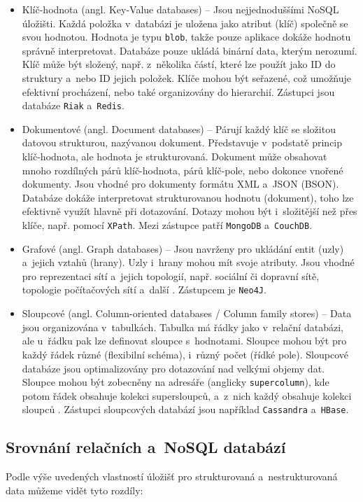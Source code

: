 \begin{itemize}
    \item Klíč-hodnota (angl. Key-Value databases) -- Jsou nejjednoduššími NoSQL úložišti. Každá položka v~databázi je uložena jako atribut (klíč) společně se svou hodnotou. Hodnota je typu \texttt{blob}, takže pouze aplikace dokáže hodnotu správně interpretovat. Databáze pouze ukládá binární data, kterým nerozumí. Klíč může být složený, např. z~několika částí, které lze použít jako ID do struktury a~nebo ID jejich položek. Klíče mohou být seřazené, což umožňuje efektivní procházení, nebo také organizovány do hierarchií. Zástupci jsou databáze \texttt{Riak} a~\texttt{Redis}.
    
    \item Dokumentové (angl. Document databases) -- Párují každý klíč se složitou datovou strukturou, nazývanou dokument. Představuje v~podstatě princip klíč-hodnota, ale hodnota je strukturovaná. Dokument může obsahovat mnoho rozdílných párů klíč-hodnota, párů klíč-pole, nebo dokonce vnořené dokumenty. Jsou vhodné pro dokumenty formátu XML a~JSON (BSON).
    Databáze dokáže interpretovat strukturovanou hodnotu (dokument), toho lze efektivně využít hlavně při dotazování. Dotazy mohou být i~složitější než přes klíče, např. pomocí \texttt{XPath}. Mezi zástupce patří \texttt{MongoDB} a~\texttt{CouchDB}.
    
    \item Grafové (angl. Graph databases) -- Jsou navrženy pro ukládání entit (uzly) a~jejich vztahů (hrany). Uzly i~hrany mohou mít svoje atributy. Jsou vhodné pro reprezentaci sítí a~jejich topologií, např. sociální či dopravní sítě, topologie počítačových sítí a~další \cite{noSqlPdb}.
    Zástupcem je \texttt{Neo4J}.
    
    \item Sloupcové (angl. Column-oriented databases / Column family stores) -- Data jsou organizována v~tabulkách. Tabulka má řádky jako v~relační databázi, ale u~řádku pak lze definovat sloupce s~hodnotami. Sloupce mohou být pro každý řádek různé (flexibilní schéma), i~různý počet (řídké pole). Sloupcové databáze jsou optimalizovány pro dotazování nad velkými objemy dat. Sloupce mohou být zobecněny na adresáře (anglicky \texttt{supercolumn}), kde potom řádek obsahuje kolekci supersloupců, a~z~nich každý obsahuje kolekci sloupců \cite{noSqlPdb}. Zástupci sloupcových databází jsou například \texttt{Cassandra} a~\texttt{HBase}.
\end{itemize}

\subsection{Srovnání relačních a~NoSQL databází}
Podle výše uvedených vlastností úložišť pro strukturovaná a~nestrukturovaná data můžeme vidět tyto rozdíly:

